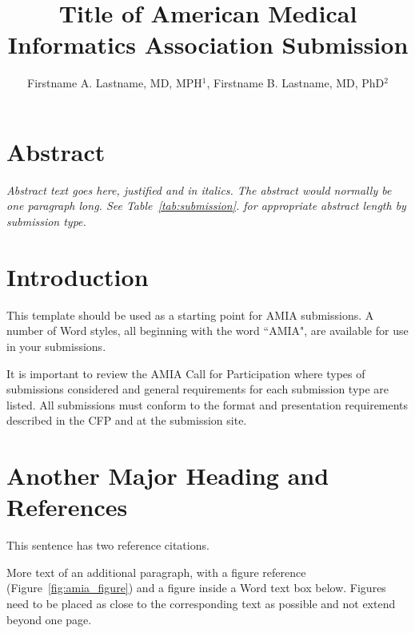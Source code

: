 \documentclass{amia}
\begin{document}
\title{Title of American Medical Informatics Association Submission}

\author{Firstname A. Lastname, MD, MPH$^1$, Firstname B. Lastname, MD, PhD$^2$ }


\maketitle

\section*{Abstract}

\textit{Abstract text goes here, justified and in italics.  The abstract would normally be one paragraph long.  See Table~\ref{tab:submission}. for appropriate abstract length by submission type.}

\section*{Introduction}

This template should be used as a starting point for AMIA submissions.  A number of Word styles, all beginning with the word ``AMIA", are available for use in your submissions.

It is important to review the AMIA Call for Participation where types of submissions considered and general requirements for each submission type are listed. All submissions must conform to the format and presentation requirements described in the CFP and at the submission site.

\section*{Another Major Heading and References}

This sentence has two reference citations\cite{pryor83,gardner90}.

More text of an additional paragraph, with a figure reference (Figure~\ref{fig:amia_figure}) and a figure inside a Word text box below.  Figures need to be placed as close to the corresponding text as possible and not extend beyond one page.
\end{document}
